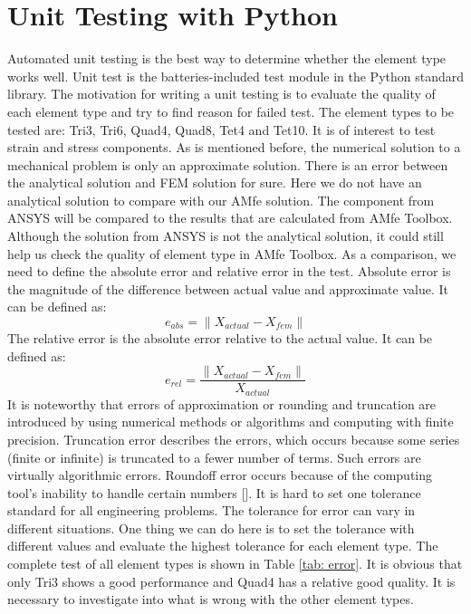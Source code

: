\section{Unit Testing with Python}
Automated unit testing is the best way to determine whether the element type works well. Unit test is the batteries-included test module in the Python standard library. The motivation for writing a unit testing is to evaluate the quality of each element type and try to find reason for failed test. The element types to be tested are: Tri3, Tri6, Quad4, Quad8, Tet4 and Tet10. It is of interest to test strain and stress components. As is mentioned before, the numerical solution to a mechanical problem is only an approximate solution. There is an error between the analytical solution and FEM solution for sure. Here we do not have an analytical solution to compare with our AMfe solution. The component from ANSYS will be compared to the results that are calculated from AMfe Toolbox. Although the solution from ANSYS is not the analytical solution, it could still help us check the quality of element type in AMfe Toolbox. As a comparison, we need to define the absolute error and relative error in the test. Absolute error is the magnitude of the difference between actual value and approximate value. It can be defined as:
\begin{equation}
e_{abs} = \|X_{actual} - X_{fem} \|
\end{equation}
The relative error is the absolute error relative to the actual value. It can be defined as:
\begin{equation}
e_{rel} = \frac{\|X_{actual} - X_{fem} \|}{X_{actual}}
\end{equation} 
It is noteworthy that errors of approximation or rounding and truncation are introduced by using numerical methods or algorithms and computing with finite precision. Truncation error describes the errors, which occurs because some series (finite or infinite) is truncated to a fewer number of terms. Such errors are virtually algorithmic errors. Roundoff error occurs because of the computing tool's inability to handle certain numbers [\cite{NumericalMethod}]. It is hard to set one tolerance standard for all engineering problems. The tolerance for error can vary in different situations. One thing we can do here is to set the tolerance with different values and evaluate the highest tolerance for each element type. The complete test of all element types is shown in Table \ref{tab: error}. It is obvious that only Tri3 shows a good performance and Quad4 has a relative good quality. It is necessary to investigate into what is wrong with the other element types. 

